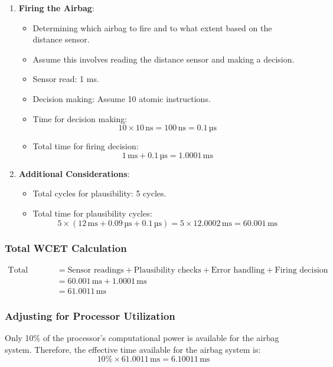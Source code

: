 \documentclass[12pt	]{article}
\begin{document}
\begin{enumerate}
	
	\item \textbf{Firing the Airbag}:
	\begin{itemize}
		\item Determining which airbag to fire and to what extent based on the distance sensor.
		\item Assume this involves reading the distance sensor and making a decision.
		\item Sensor read: 1 ms.
		\item Decision making: Assume 10 atomic instructions.
		\item Time for decision making:
		\[
		10 \times 10 \, \text{ns} = 100 \, \text{ns} = 0.1 \, \text{µs}
		\]
		\item Total time for firing decision:
		\[
		1 \, \text{ms} + 0.1 \, \text{µs} = 1.0001 \, \text{ms}
		\]
	\end{itemize}
	
	
	
	\item \textbf{Additional Considerations}:
	\begin{itemize}
		\item Total cycles for plausibility: 5 cycles.
		\item Total time for plausibility cycles:
		\[
		5 \times (12 \, \text{ms} + 0.09 \, \text{µs} + 0.1 \, \text{µs}) = 5 \times 12.0002 \, \text{ms} = 60.001 \, \text{ms}
		\]
	\end{itemize}
\end{enumerate}



\subsubsection{Total WCET Calculation}
\begin{align*}
	\text{Total WCET} &= \text{Sensor readings} + \text{Plausibility checks} + \text{Error handling} + \text{Firing decision} \\
	&= 60.001 \, \text{ms} + 1.0001 \, \text{ms} \\
	&= 61.0011 \, \text{ms}
\end{align*}

\subsubsection{Adjusting for Processor Utilization}
Only 10\% of the processor's computational power is available for the airbag system. Therefore, the effective time available for the airbag system is:
\[
10\% \times 61.0011 \, \text{ms} = 6.10011 \, \text{ms}
\]
\end{document}
